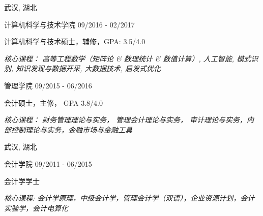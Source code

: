 \vspace{-5.0mm}

\begin{cventries}
\vspace{-1.5mm}
\cveducation
{}
{武汉, 湖北}

\cvsubeducation
{计算机科学与技术学院}
{09/2016 - 02/2017}
{
    \begin{cvitems}
    \item {计算机科学与技术硕士，辅修，GPA: 3.5/4.0}
    \item {\itshape{核心课程： 高等工程数学（矩阵论 \& 数理统计 \& 数值计算）, 人工智能, 模式识别, 知识发现与数据开采, 大数据技术, 启发式优化}}
    \end{cvitems}
}
\vspace{-1.0mm}

\cvsubeducation
{管理学院}
{09/2015 - 06/2016}
{
    \begin{cvitems}
    \item {会计硕士，主修， GPA 3.8/4.0}
    \item {\itshape{核心课程： 财务管理理论与实务， 管理会计理论与实务， 审计理论与实务，内部控制理论与实务，金融市场与金融工具}}
    \end{cvitems}
}

\cveducation
{}
{武汉, 湖北}

\cvsubeducation
{会计学院}
{09/2011 - 06/2015}
{
    \begin{cvitems}
    \item {会计学学士}
    \item {\itshape{核心课程: 会计学原理，中级会计学，管理会计学（双语），企业资源计划，会计实验学，会计电算化}}
    \end{cvitems}
}
\end{cventries}